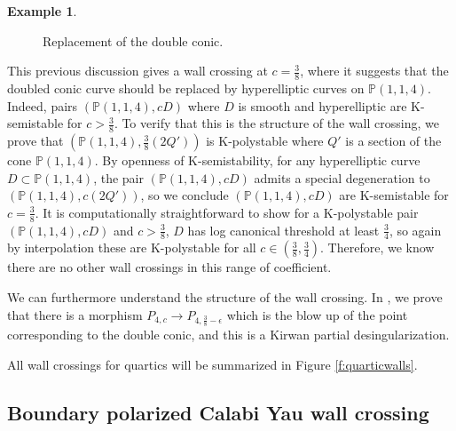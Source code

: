 \documentclass[11pt]{amsart}
\numberwithin{equation}{section}
\theoremstyle{definition}
\newtheorem{example}[theorem]{Example}
\newcommand{\bP}{\mathbb{P}}
\begin{document}
\begin{example}
\begin{figure}[h]
\vspace{-.5in}
\caption{Replacement of the double conic.}
\label{f:doubleconic}
\end{figure}


This previous discussion gives a wall crossing at $c = \frac{3}{8}$, where it suggests that the doubled conic curve should be replaced by hyperelliptic curves on $\bP(1,1,4)$.  Indeed, pairs $(\bP(1,1,4),cD)$ where $D$ is smooth and hyperelliptic are K-semistable for $c > \frac{3}{8}$.  To verify that this is the structure of the wall crossing, we prove that $(\bP(1,1,4),\frac{3}{8}(2Q'))$ is K-polystable where $Q'$ is a section of the cone $\bP(1,1,4)$.  By openness of K-semistability, for any hyperelliptic curve $D \subset \bP(1,1,4)$, the pair $(\bP(1,1,4),cD)$ admits a special degeneration to $(\bP(1,1,4), c(2Q'))$, so we conclude $(\bP(1,1,4),cD)$ are K-semistable for $c = \frac{3}{8}$.  It is computationally straightforward to show for a K-polystable pair $(\bP(1,1,4), c D)$ and $c> \frac{3}{8}$, $D$ has log canonical threshold at least $\frac{3}{4}$, so again by interpolation these are K-polystable for all $c\in(\frac{3}{8},\frac{3}{4})$.  Therefore, we know there are no other wall crossings in this range of coefficient.

We can furthermore understand the structure of the wall crossing.  In \cite{ADLpub}, we prove that there is a morphism $P_{4,c} \to P_{4,\frac{3}{8} - \epsilon}$ which is the blow up of the point corresponding to the double conic, and this is a Kirwan partial desingularization. 

\end{example}

All wall crossings for quartics will be summarized in Figure \ref{f:quarticwalls}.





\subsection{Boundary polarized Calabi Yau wall crossing}
\end{document}
